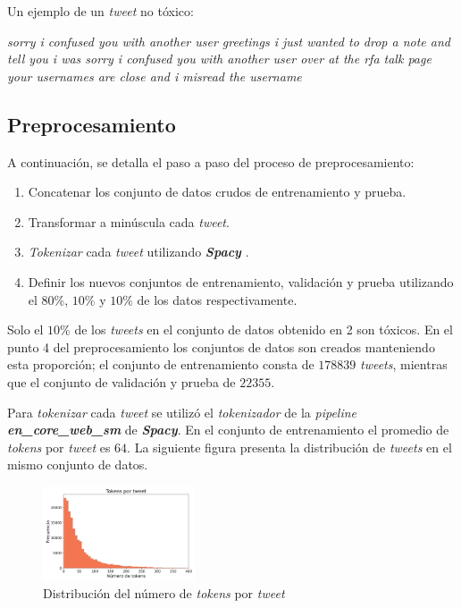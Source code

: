 Un ejemplo de un \textit{tweet} no tóxico:

\textit{sorry i confused you with another user greetings i just wanted to drop a note and tell you i was sorry i confused you with another user over at the rfa talk page your usernames are close and i misread the username}

\subsection{Preprocesamiento}

A continuación, se detalla el paso a paso del proceso de preprocesamiento:

\begin{enumerate}[topsep=0pt,itemsep=0ex]
	\item Concatenar los conjunto de datos crudos de entrenamiento y prueba.
	\item Transformar a minúscula cada \textit{tweet}.
	\item \textit{Tokenizar} cada \textit{tweet} utilizando \textbf{\textit{Spacy}} \cite{Honnibal_spaCy_Industrial-strength_Natural_2020}.
	\item Definir los nuevos conjuntos de entrenamiento, validación y prueba utilizando el $80\%$, $10\%$ y $10\%$ de los datos respectivamente.
\end{enumerate}

Solo el $10\%$ de los \textit{tweets} en el conjunto de datos obtenido en 2 son tóxicos. En el punto 4 del preprocesamiento los conjuntos de datos son creados manteniendo esta proporción; el conjunto de entrenamiento consta de $178839$ \textit{tweets}, mientras que el conjunto de validación y prueba de $22355$.

Para \textit{tokenizar} cada \textit{tweet} se utilizó el \textit{tokenizador} de la \textit{pipeline} \textbf{\textit{en\_core\_web\_sm}} de \textbf{\textit{Spacy}}. En el conjunto de entrenamiento el promedio de \textit{tokens} por \textit{tweet} es $64$. La siguiente figura presenta la distribución de \textit{tweets} en el mismo conjunto de datos.

\begin{figure}[h]
\centering
\includegraphics[width=0.4\textwidth]{tokens}
\caption{\label{fig:tokens} Distribución del número de \textit{tokens} por \textit{tweet}}
\end{figure}

